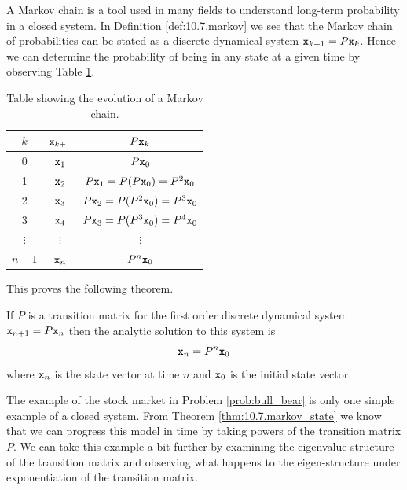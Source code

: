 A Markov chain is a tool used in many fields to understand long-term probability in a
closed system.  In Definition \ref{def:10.7.markov} we see that the Markov chain of
probabilities can be stated as a discrete dynamical system $\texttt{x}_{k+1} = P \texttt{x}_k$.  Hence
we can determine the probability of being in any state at a given time by observing Table
\ref{tab:10.7.markov}.
\begin{table}[ht!]
    \begin{center}
        \begin{tabular}{|c|c|c|}
            \hline
            $k$ & $\texttt{x}_{k+1}$ & $P\texttt{x}_k$ \\ \hline \hline
            0 & $\texttt{x}_1$ & $P\texttt{x}_0$ \\
            1 & $\texttt{x}_2$ & $P\texttt{x}_1 = P(P\texttt{x}_0) = P^2 \texttt{x}_0$ \\
            2 & $\texttt{x}_3$ & $P\texttt{x}_2 = P(P^2 \texttt{x}_0) = P^3 \texttt{x}_0$ \\
            3 & $\texttt{x}_4$ & $P\texttt{x}_3 = P(P^3 \texttt{x}_0) = P^4 \texttt{x}_0$ \\
            $\vdots$ & $\vdots$ & $\vdots$ \\
            $n-1$ & $\texttt{x}_n$ & $P^{n} \texttt{x}_0$ \\\hline
        \end{tabular}
    \end{center}
    \caption{Table showing the evolution of a Markov chain.}
    \label{tab:10.7.markov}
\end{table}
This proves the following theorem.
\begin{thm}\label{thm:10.7.markov_state}
    If $P$ is a transition matrix for the first order discrete dynamical system
    $\texttt{x}_{n+1} = P \texttt{x}_n$ then the analytic solution to this system is
    \[ \texttt{x}_n = P^n \texttt{x}_0 \]
    where $\texttt{x}_n$ is the state vector at time $n$ and $\texttt{x}_0$ is the initial state vector.
\end{thm}






The example of the stock market in Problem \ref{prob:bull_bear} is only one simple
example of a closed system.  From Theorem \ref{thm:10.7.markov_state} we know that we can
progress this model in time by taking powers of the transition matrix $P$.   We can take
this example a bit further by examining the eigenvalue structure of the transition matrix
and observing what happens to the eigen-structure under exponentiation of the transition
matrix.

